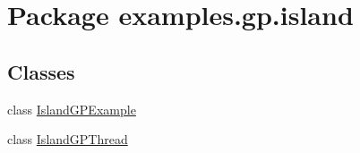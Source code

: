 \hypertarget{namespaceexamples_1_1gp_1_1island}{\section{Package examples.\-gp.\-island}
\label{namespaceexamples_1_1gp_1_1island}
}
\subsection*{Classes}
\begin{DoxyCompactItemize}
\item 
class \hyperlink{classexamples_1_1gp_1_1island_1_1_island_g_p_example}{Island\-G\-P\-Example}
\item 
class \hyperlink{classexamples_1_1gp_1_1island_1_1_island_g_p_thread}{Island\-G\-P\-Thread}
\end{DoxyCompactItemize}
